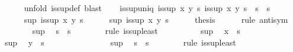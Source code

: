 \begin{isabellebody}
\ \ \ \ \isamarkupfalse%
\ {\isacharparenleft}unfold\ is{\isacharunderscore}sup{\isacharunderscore}def{\isacharparenright}\ blast%
\endisataginvisible
{\isafoldinvisible}%
%
\isadeliminvisible
\isanewline
%
\endisadeliminvisible
\isanewline
\ \ \isamarkupfalse%
\ is{\isacharunderscore}sup{\isacharunderscore}uniq{\isacharcolon}\ {\isachardoublequoteopen}{\isasymlbrakk}is{\isacharunderscore}sup\ x\ y\ s{\isacharsemicolon}\ is{\isacharunderscore}sup\ x\ y\ s{\isacharprime}{\isasymrbrakk}\ {\isasymLongrightarrow}\ s\ {\isacharequal}\ s{\isacharprime}{\isachardoublequoteclose}\isanewline
%
\isadelimproof
\ \ \ \ %
\endisadelimproof
%
\isatagproof
{}\isamarkupfalse%
\ {\isacharminus}\isanewline
\ \ \ \ \isamarkupfalse%
\ sup{\isacharcolon}\ {\isachardoublequoteopen}is{\isacharunderscore}sup\ x\ y\ s{\isachardoublequoteclose}\isanewline
\ \ \ \ \isamarkupfalse%
\ sup{\isacharprime}{\isacharcolon}\ {\isachardoublequoteopen}is{\isacharunderscore}sup\ x\ y\ s{\isacharprime}{\isachardoublequoteclose}\isanewline
\ \ \ \ \isamarkupfalse%
\ {\isacharquery}thesis\isanewline
\ \ \ \ \isamarkupfalse%
\ {\isacharparenleft}rule\ anti{\isacharunderscore}sym{\isacharparenright}\isanewline
\ \ \ \ \ \ \isamarkupfalse%
\ sup\ \isamarkupfalse%
\ {\isachardoublequoteopen}s\ {\isasymsqsubseteq}\ s{\isacharprime}{\isachardoublequoteclose}\isanewline
\ \ \ \ \ \ \isamarkupfalse%
\ {\isacharparenleft}rule\ is{\isacharunderscore}sup{\isacharunderscore}least{\isacharparenright}\isanewline
\ \ \ \ \ \ \ \ \isamarkupfalse%
\ sup{\isacharprime}\ \isamarkupfalse%
\ {\isachardoublequoteopen}x\ {\isasymsqsubseteq}\ s{\isacharprime}{\isachardoublequoteclose}\ \isacommand{{\isachardot}{\isachardot}}\isamarkupfalse%
\isanewline
\ \ \ \ \ \ \ \ \isamarkupfalse%
\ sup{\isacharprime}\ \isamarkupfalse%
\ {\isachardoublequoteopen}y\ {\isasymsqsubseteq}\ s{\isacharprime}{\isachardoublequoteclose}\ \isacommand{{\isachardot}{\isachardot}}\isamarkupfalse%
\isanewline
\ \ \ \ \ \ \isamarkupfalse%
\isanewline
\ \ \ \ \ \ \isamarkupfalse%
\ sup{\isacharprime}\ \isamarkupfalse%
\ {\isachardoublequoteopen}s{\isacharprime}\ {\isasymsqsubseteq}\ s{\isachardoublequoteclose}\isanewline
\ \ \ \ \ \ \isamarkupfalse%
\ {\isacharparenleft}rule\ is{\isacharunderscore}sup{\isacharunderscore}least{\isacharparenright}\isanewline

\end{isabellebody}
